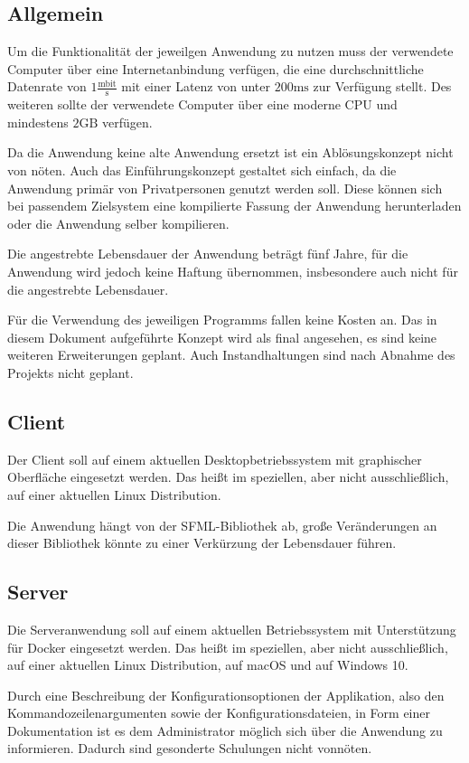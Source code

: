 \subsection{Allgemein}
Um die Funktionalität der jeweilgen Anwendung zu nutzen muss der verwendete Computer über eine Internetanbindung verfügen, die eine durchschnittliche Datenrate von $1 \frac{\text{mbit}}{\text{s}}$ mit einer Latenz von unter $200\text{ms}$ zur Verfügung stellt. Des weiteren sollte der verwendete Computer über eine moderne CPU und mindestens $2\text{GB}$ verfügen.

Da die Anwendung keine alte Anwendung ersetzt ist ein Ablösungskonzept nicht von nöten. Auch das Einführungskonzept gestaltet sich einfach, da die Anwendung primär von Privatpersonen genutzt werden soll. Diese können sich bei passendem Zielsystem eine kompilierte Fassung der Anwendung herunterladen oder die Anwendung selber kompilieren.

Die angestrebte Lebensdauer der Anwendung beträgt fünf Jahre, für die Anwendung wird jedoch keine Haftung übernommen, insbesondere auch nicht für die angestrebte Lebensdauer.

Für die Verwendung des jeweiligen Programms fallen keine Kosten an. Das in diesem Dokument aufgeführte Konzept wird als final angesehen, es sind keine weiteren Erweiterungen geplant. Auch Instandhaltungen sind nach Abnahme des Projekts nicht geplant.

\subsection{Client}
Der Client soll auf einem aktuellen Desktopbetriebssystem mit graphischer Oberfläche eingesetzt werden. Das heißt im speziellen, aber nicht ausschließlich, auf einer aktuellen Linux Distribution.

Die Anwendung hängt von der SFML-Bibliothek ab, große Veränderungen an dieser Bibliothek könnte zu einer Verkürzung der Lebensdauer führen.

\subsection{Server}
Die Serveranwendung soll auf einem aktuellen Betriebssystem mit Unterstützung für Docker eingesetzt werden. Das heißt im speziellen, aber nicht ausschließlich, auf einer aktuellen Linux Distribution, auf macOS und auf Windows 10.

Durch eine Beschreibung der Konfigurationsoptionen der Applikation, also den Kommandozeilenargumenten sowie der Konfigurationsdateien, in Form einer Dokumentation ist es dem Administrator möglich sich über die Anwendung zu informieren. Dadurch sind gesonderte Schulungen nicht vonnöten.


